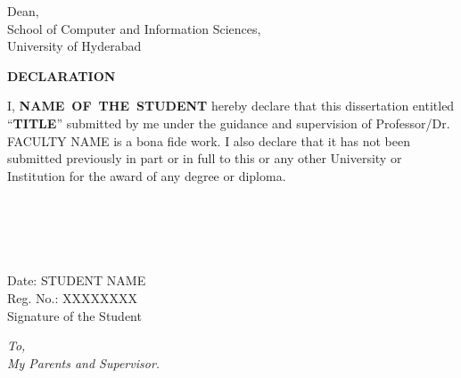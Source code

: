 \documentclass[a4,12pt,oneside]{book}
\renewenvironment{frontmatter}{\pagenumbering{roman}}{\newpage
  \pagenumbering{arabic}}
\newenvironment{dedication}{
  \thispagestyle{empty}
  \clearpage\null\vfill
  \sl \hspace{1in}To,\\
  
  \hspace{1.5in}}{
  \vspace{3in}\vfill\null}
\def\prefacesection#1{%
  \chapter*{#1}
  \addcontentsline{toc}{chapter}{#1}
  \markboth{#1}{#1}}
\newenvironment{abstract}{\null\vfil\prefacesection{Abstract}}{\par\vfill\null}
\newenvironment{acknowledgments}{\null\vfil\prefacesection{Acknowledgments}}{\par\vfill\null}
\begin{document}
\begin{frontmatter}
{	\vspace{1.0in}
	{\flushright Dean,\\
	School of Computer and Information Sciences,\\
	University of Hyderabad\\}
	}

\newpage
	{%
	\thispagestyle{empty}
	\begin{center} 
		\textbf{\large DECLARATION}  
	\end{center}\vspace{.75in}

	{\sloppy I, \textbf{\mbox{NAME OF THE STUDENT}} hereby declare that this dissertation entitled ``\textbf{TITLE}'' submitted by me under the guidance and supervision of Professor/Dr. FACULTY NAME is a bona fide work. I also declare that it has not been submitted previously in part or in full to this or any other University or Institution for the award of any degree or diploma. }\\ \\ \\ \\ \\ \\

	{\flushleft Date:   } 
	{\flushright STUDENT NAME\\
	Reg. No.: XXXXXXXX\\
	\vspace{0.5in}
	Signature of the Student\\
	}
	}

    	\begin{dedication}
    	\thispagestyle{empty}
      		My Parents and Supervisor.
    	\end{dedication}
    
    
    
    	\tableofcontents
    	\listoffigures
    	\listoftables
\end{frontmatter}
  
%
\end{document}
